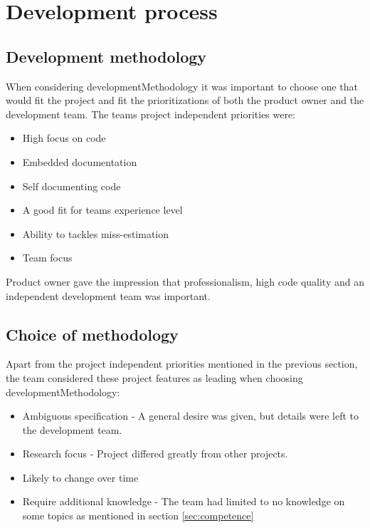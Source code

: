 \chapter{Development process}
\label{chap:process}

\section{Development methodology}

When considering \gls{developmentMethodology} it was important to choose one that would fit the project and fit the prioritizations of both the product owner and the development team.
The teams project independent priorities were:
\begin{itemize}
    \item High focus on code
    \item Embedded documentation
    \item Self documenting code
    \item A good fit for teams experience level
    \item Ability to tackles miss-estimation
    \item Team focus
\end{itemize}

Product owner gave the impression that professionalism, high code quality and an independent development team was important.

\section{Choice of methodology}
\label{sec:methodology}
Apart from the project independent priorities mentioned in the previous section, the team considered these project features as leading when choosing \gls{developmentMethodology}:

\begin{itemize}
    \item Ambiguous specification - A general desire was given, but details were left to the development team.
    \item Research focus - Project differed greatly from other projects.
    \item Likely to change over time
    \item Require additional knowledge - The team had limited to no knowledge on some topics as mentioned in section \ref{sec:competence}
\end{itemize}


